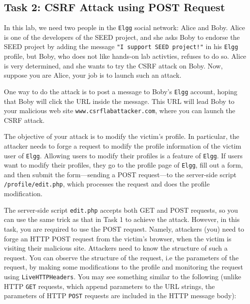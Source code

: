 \subsection{Task 2: CSRF Attack using POST Request}

In this lab, we need two people in the {\tt Elgg} social network: Alice and Boby. Alice is
one of the developers of the SEED project, and she asks Boby to 
endorse the SEED project by adding the message
{\tt "I support SEED project!"} in his {\tt Elgg} profile, but   
Boby, who does not like hands-on lab activties, refuses to do so.  
Alice is very determined, and she wants to try the CSRF attack on Boby. 
Now, suppose you are Alice, your job is to launch such an attack. 

One way to do the attack is to post a message to Boby's {\tt Elgg} account, hoping that 
Boby will click the URL inside the message. This URL will lead Boby to your
malicious web site {\tt www.csrflabattacker.com}, where you can launch the
CSRF attack. 

The objective of your attack is to modify the victim's profile. 
In particular, the attacker needs to forge a request 
to modify the profile information of the victim user of {\tt Elgg}. 
Allowing users to modify their profiles is a feature of 
{\tt Elgg}. If  users want to modify their profiles,
they go to the profile page of {\tt Elgg}, fill out 
a form, and then submit the form---sending a POST request---to 
the server-side script {\tt /profile/edit.php}, which 
processes the request and does the profile modification.


The server-side script {\tt edit.php} accepts both GET and POST requests,
so you can use the same trick as that in Task 1 to achieve the attack.
However, in this task, you are required to use the POST request. 
Namely, attackers (you) need to forge an HTTP POST request from the victim's
browser, when the victim is visiting their malicious site. 
Attackers need to know the structure of such a request.
You can observe the
structure of the request, i.e the parameters of the request, by making
some modifications to the profile and monitoring the request using
\texttt{LiveHTTPHeaders}. You may see something similar to
the following (unlike HTTP {\tt GET} requests, which append 
parameters to the URL strings, the parameters of HTTP {\tt POST} requests are 
included in the HTTP message body): 


